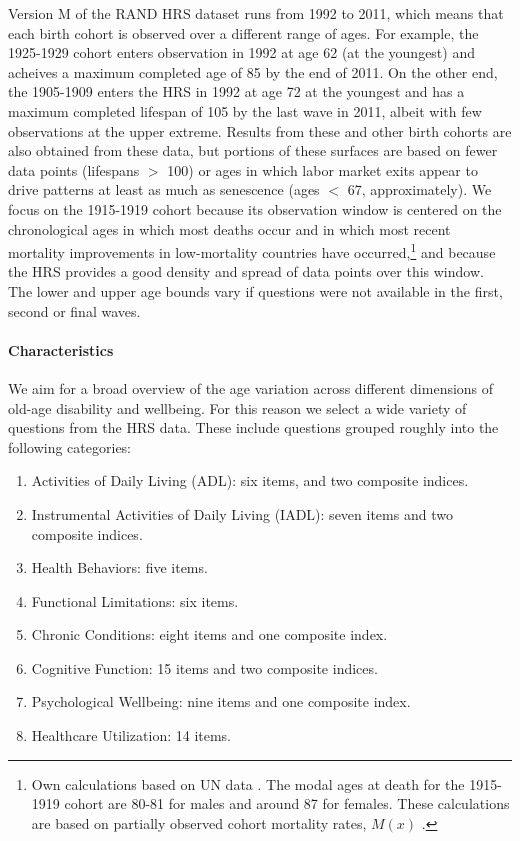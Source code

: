 \documentclass[11pt,oneside]{article} %
\begin{document}
Version M of the RAND HRS dataset runs from 1992 to 2011, which
means that each birth cohort is observed over a different range of ages. For
example, the 1925-1929 cohort enters observation in 1992 at age 62 (at the
youngest) and acheives a maximum completed age of 85 by the end of 2011. On the
other end, the 1905-1909 enters the HRS in 1992 at age 72 at the youngest and
has a maximum completed lifespan of 105 by the last wave in 2011, albeit with
few observations at the upper extreme. Results from these and other birth
cohorts are also obtained from these data, but portions of these surfaces are
based on fewer data points (lifespans $>$ 100) or ages in which labor market
exits appear to drive patterns at least as much as senescence (ages $<$ 67,
approximately). We focus on the 1915-1919 cohort because its observation window
is centered on the chronological ages in which most deaths occur and in which most recent mortality improvements in low-mortality countries have occurred,\footnote{Own calculations based on UN
data \citep{UN2012prospects}. The modal ages at death for the 1915-1919 cohort
are 80-81 for males and around 87 for females. These calculations are based on
partially observed cohort mortality rates, $M(x)$ \citep{HMD}.} and because the
HRS provides a good density and spread of data points over this window. The lower and upper age bounds vary if questions were not available in the first, second or final waves.

\paragraph*{Characteristics}
We aim for a broad overview of the age variation across different dimensions of
old-age disability and wellbeing. For this reason we select a wide variety of
questions from the HRS data. These include questions
grouped roughly into the following categories: 

\begin{enumerate}
  \item Activities of Daily Living (ADL): six items, and two composite indices.
  \item Instrumental Activities of Daily Living (IADL): seven items and two
  composite indices.
  \item Health Behaviors: five items.
  \item Functional Limitations: six items.
  \item Chronic Conditions: eight items and one composite index.
  \item Cognitive Function: 15 items and two composite indices.
  \item Psychological Wellbeing: nine items and one composite index.
  \item Healthcare Utilization: 14 items.
\end{enumerate}
\end{document}
